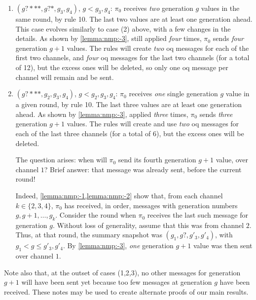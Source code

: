 \begin{remark}
\begin{enumerate}
    \medskip
    \item $(g?***, g?*, g_3, g_4)$, $g < g_3, g_4$: 
    $\pi_0$ receives \emph{two} generation $g$ values in the same round, by rule 10.
    The last two values are at least one generation ahead.    
    This case evolves similarly to case (2) above, with a few changes in the details.
    As shown by \cref{lemma:nmp:-3}, still applied \emph{four} times, 
    $\pi_0$ sends \emph{four} generation $g+1$ values.
    The rules will create \emph{two} \gls{oq} messages for each of the first two channels,
    and \emph{four} \gls{oq} messages for the last two channels (for a total of 12),
    but the excess ones will be deleted, so only one \gls{oq} message per channel will remain and be sent.
    
    \medskip
    \item $(g?***, g_2, g_3, g_4)$, $g < g_2, g_3, g_4$: 
    $\pi_0$ receives \emph{one} single generation $g$ value in a given round, by rule 10.
    The last three values are at least one generation ahead.
    As shown by \cref{lemma:nmp:-3}, applied \emph{three} times, 
    $\pi_0$ sends \emph{three} generation $g+1$ values.
    The rules will create and use \emph{two} \gls{oq} messages for each of the last three channels (for a total of 6), but the excess ones will be deleted.
    
    \medskip
    The question arises: when will $\pi_0$ send its fourth generation $g+1$ value, over channel $1$? Brief answer: that message was already sent,
    before the current round!
    
    \medskip
    Indeed, \cref{lemma:nmp:-1,lemma:nmp:-2} show that,
    from each channel $k \in \{ 2, 3, 4\}$, 
    $\pi_0$ has received, in order, 
    messages with generation numbers $g, g+1, \ldots, g_k$.
    Consider the round when $\pi_0$ receives the last such message for generation $g$. Without loss of generality, assume that this was from channel $2$.
    Thus, at that round, the summary snapshot was $(g_1, g?, g'_3, g'_4)$,
    with $g_1 < g \leq g'_3, g'_4$.
    By \cref{lemma:nmp:-3}, \emph{one} generation $g+1$ value was then sent over channel $1$.
    \end{enumerate}    
    
    Note also that, at the outset of cases (1,2,3), no other messages for generation $g+1$ will have been sent yet because too few messages at generation $g$ have been received. 
    These notes may be used to create alternate proofs of our main results.

\end{remark}

